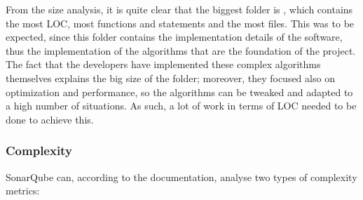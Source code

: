             From the size analysis, it is quite clear that the biggest folder is , which contains the most LOC, most functions and statements and the most files. This was to be expected, since this folder contains the implementation details of the software, thus the implementation of the algorithms that are the foundation of the project. The fact that the developers have implemented these complex algorithms themselves explains the big size of the folder; moreover, they focused also on optimization and performance, so the algorithms can be tweaked and adapted to a high number of situations. As such, a lot of work in terms of LOC needed to be done to achieve this.
        
        \subsubsection{Complexity}
            SonarQube can, according to the documentation, analyse two types of complexity metrics: 
